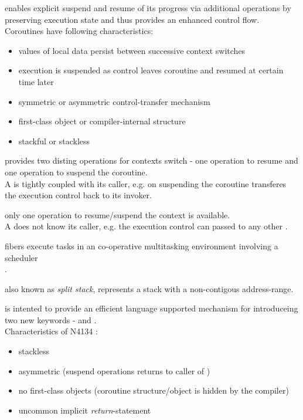 enables explicit suspend and resume of its progress via additional operations by
preserving execution state and thus provides an enhanced control flow.\\
Coroutines have following characteristics\cite{N3985}:
\begin{itemize}
    \item values of local data persist between successive context switches
    \item execution is suspended as control leaves coroutine and resumed at
          certain time later
    \item symmetric or asymmetric control-transfer mechanism
    \item first-class object or compiler-internal structure
    \item stackful or stackless
\end{itemize}

\uabschnitt{\ascoro:}
provides two disting operations for contexts switch - one operation to
resume and one operation to suspend the coroutine.\\
A \ascoro is tightly coupled with its caller, e.g. on suspending the
coroutine transferes the execution control back to its invoker.

\uabschnitt{\sycoro:}
only one operation to resume/suspend the context is available.\\
A \sycoro does not know its caller, e.g. the execution control can passed to
any other \sycoro.

fibers execute tasks in an co-operative multitasking environment involving
a scheduler\\.

also known as \textit{split stack}\cite{gccsplit}, represents a stack with
a non-contigous address-range.

is intented to provide an efficient language supported mechanism for \slcoros
introduceing two new keywords - \await and \yield.\\
Characteristics of N4134 \slcoros:
\begin{itemize}
    \item stackless
    \item asymmetric (suspend operations returns to caller of \slcoro)
    \item no first-class objects (coroutine structure/object is hidden by the
          compiler)
    \item uncommon implicit \textit{return}-statement\cite{N4134}
\end{itemize}
